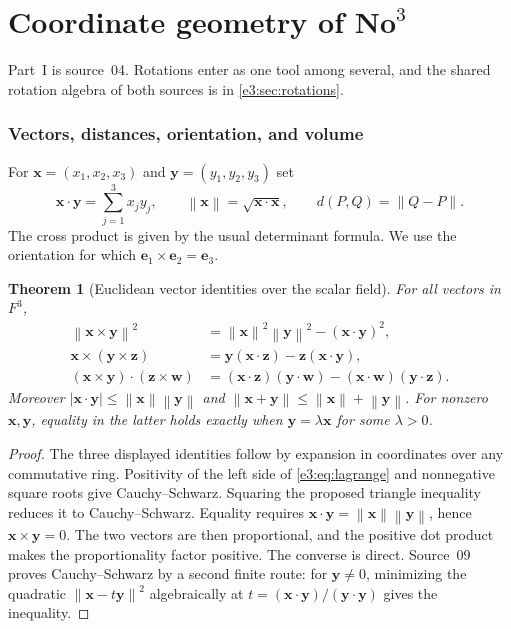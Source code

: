 \documentclass[11pt,letterpaper]{article}
\numberwithin{equation}{section}
\newtheorem{theorem}{Theorem}[section]
\theoremstyle{definition}
\theoremstyle{remark}
\newcommand{\No}{\mathbf{No}}
\newcommand{\norm}[1]{\left\lVert#1\right\rVert}
\newcommand{\vv}[1]{\bm{#1}}
\begin{document}
\part{Coordinate geometry of \texorpdfstring{$\No^3$}{No\^{}3}}\label{e3:part:geometry}

Part~I is source~04. Rotations enter as one tool among several, and the shared
rotation algebra of both sources is in \cref{e3:sec:rotations}.

\section{Vectors, distances, orientation, and volume}\label{e3:sec:vectors}

For $\vv x=(x_1,x_2,x_3)$ and $\vv y=(y_1,y_2,y_3)$ set
\[
 \vv x\cdot\vv y=\sum_{j=1}^3x_jy_j,\qquad
 \norm{\vv x}=\sqrt{\vv x\cdot\vv x},\qquad
 d(P,Q)=\norm{Q-P}.
\]
The cross product is given by the usual determinant formula. We use the
orientation for which $\vv e_1\times\vv e_2=\vv e_3$.

\begin{theorem}[Euclidean vector identities over the scalar field]\label{e3:thm:vector}
For all vectors in $F^3$,
\begin{align}
 \norm{\vv x\times\vv y}^{2}
 &=\norm{\vv x}^{2}\norm{\vv y}^{2}-(\vv x\cdot\vv y)^2,\label{e3:eq:lagrange}\\
 \vv x\times(\vv y\times\vv z)
 &=\vv y(\vv x\cdot\vv z)-\vv z(\vv x\cdot\vv y),\label{e3:eq:triple}\\
 (\vv x\times\vv y)\cdot(\vv z\times\vv w)
 &=(\vv x\cdot\vv z)(\vv y\cdot\vv w)
 -(\vv x\cdot\vv w)(\vv y\cdot\vv z).\label{e3:eq:crossdot}
\end{align}
Moreover $|\vv x\cdot\vv y|\le\norm{\vv x}\norm{\vv y}$ and
$\norm{\vv x+\vv y}\le\norm{\vv x}+\norm{\vv y}$.
For nonzero $\vv x,\vv y$, equality in the latter holds exactly when
$\vv y=\lambda\vv x$ for some $\lambda>0$.
\end{theorem}
\begin{proof}
The three displayed identities follow by expansion in coordinates over any
commutative ring. Positivity of the left side of \cref{e3:eq:lagrange} and
nonnegative square roots give Cauchy--Schwarz. Squaring the proposed triangle
inequality reduces it to Cauchy--Schwarz. Equality requires
$\vv x\cdot\vv y=\norm{\vv x}\norm{\vv y}$, hence
$\vv x\times\vv y=0$. The two vectors are then proportional, and the positive
dot product makes the proportionality factor positive. The converse is direct.
Source~09 proves Cauchy--Schwarz by a second finite route: for $\vv y\ne0$,
minimizing the quadratic $\norm{\vv x-t\vv y}^2$ algebraically at
$t=(\vv x\cdot\vv y)/(\vv y\cdot\vv y)$ gives the inequality.
\end{proof}
\end{document}
